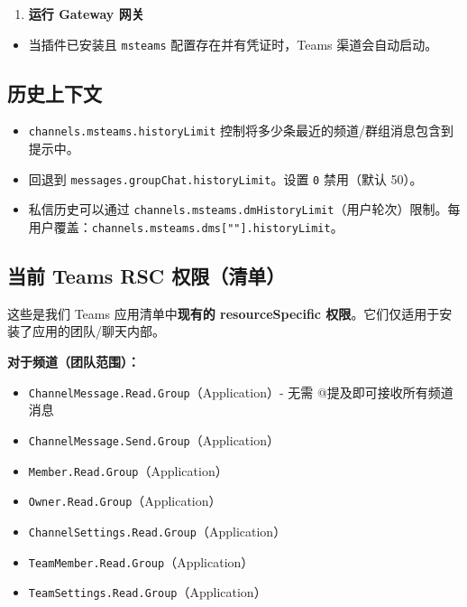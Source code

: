 \begin{enumerate}
  \item \textbf{运行 Gateway 网关}
\end{enumerate}

\begin{itemize}
  \item 当插件已安装且 \texttt{msteams} 配置存在并有凭证时，Teams 渠道会自动启动。
\end{itemize}


\subsection{历史上下文}


\begin{itemize}
  \item \texttt{channels.msteams.historyLimit} 控制将多少条最近的频道/群组消息包含到提示中。
  \item 回退到 \texttt{messages.groupChat.historyLimit}。设置 \texttt{0} 禁用（默认 50）。
  \item 私信历史可以通过 \texttt{channels.msteams.dmHistoryLimit}（用户轮次）限制。每用户覆盖：\texttt{channels.msteams.dms[""].historyLimit}。
\end{itemize}


\subsection{当前 Teams RSC 权限（清单）}


这些是我们 Teams 应用清单中\textbf{现有的 resourceSpecific 权限}。它们仅适用于安装了应用的团队/聊天内部。

\textbf{对于频道（团队范围）：}

\begin{itemize}
  \item \texttt{ChannelMessage.Read.Group}（Application）- 无需 @提及即可接收所有频道消息
  \item \texttt{ChannelMessage.Send.Group}（Application）
  \item \texttt{Member.Read.Group}（Application）
  \item \texttt{Owner.Read.Group}（Application）
  \item \texttt{ChannelSettings.Read.Group}（Application）
  \item \texttt{TeamMember.Read.Group}（Application）
  \item \texttt{TeamSettings.Read.Group}（Application）
\end{itemize}


